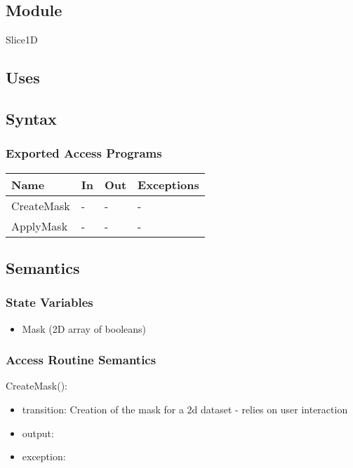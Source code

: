 \documentclass[12pt, titlepage]{article}
\begin{document}
\subsection{Module}

Slice1D

\subsection{Uses}


\subsection{Syntax}

\subsubsection{Exported Access Programs}

\begin{center}
\begin{tabular}{p{2cm} p{4cm} p{4cm} p{2cm}}
\hline
\textbf{Name} & \textbf{In} & \textbf{Out} & \textbf{Exceptions} \\
\hline
CreateMask & - & - & - \\
ApplyMask & - & - & - \\
\hline
\end{tabular}
\end{center}

\subsection{Semantics}

\subsubsection{State Variables}
\begin{itemize}
\item Mask (2D array of booleans)
\end{itemize}

\subsubsection{Access Routine Semantics}

\noindent CreateMask():
\begin{itemize}
\item transition: Creation of the mask for a 2d dataset - relies on user interaction
\item output:  
\item exception:  
\end{itemize}
\end{document}
